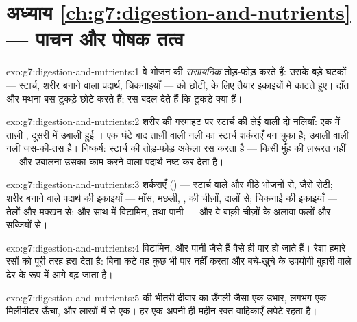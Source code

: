 \section*{अध्याय \ref{ch:g7:digestion-and-nutrients} --- पाचन और पोषक तत्व}

\begin{solution}{exo:g7:digestion-and-nutrients:1}
वे भोजन की \emph{रासायनिक} तोड़-फोड़ करते हैं: उसके बड़े घटकों ---
स्टार्च, शरीर बनाने वाला पदार्थ, चिकनाइयाँ --- को छोटी,  के लिए
तैयार इकाइयों में काटते हुए। दाँत और मथना बस टुकड़े छोटे करते हैं; रस
बदल देते हैं कि टुकड़े क्या हैं।
\end{solution}

\begin{solution}{exo:g7:digestion-and-nutrients:2}
शरीर की गरमाहट पर स्टार्च की लेई वाली दो नलियाँ: एक में ताज़ी ,
दूसरी में उबाली हुई । एक घंटे बाद ताज़ी वाली नली का स्टार्च शर्कराएँ
बन चुका है; उबाली वाली नली जस-की-तस है। निष्कर्ष: स्टार्च की तोड़-फोड़
अकेला रस करता है --- किसी मुँह की ज़रूरत नहीं --- और उबालना उसका काम
करने वाला पदार्थ नष्ट कर देता है।
\end{solution}

\begin{solution}{exo:g7:digestion-and-nutrients:3}
शर्कराएँ () --- स्टार्च वाले और मीठे भोजनों से, जैसे रोटी;
शरीर बनाने वाले पदार्थ की इकाइयाँ --- माँस, मछली, ,  की
चीज़ों, दालों से; चिकनाई की इकाइयाँ --- तेलों और मक्खन से; और साथ में
विटामिन,  तथा पानी --- और वे बाक़ी चीज़ों के अलावा फलों और
सब्ज़ियों से।
\end{solution}

\begin{solution}{exo:g7:digestion-and-nutrients:4}
विटामिन,  और पानी जैसे हैं वैसे ही पार हो जाते हैं। रेशा हमारे
रसों को पूरी तरह हरा देता है: बिना कटे वह कुछ भी पार नहीं करता और
बचे-खुचे के उपयोगी बुहारी वाले ढेर के रूप में आगे बढ़ जाता है।
\end{solution}

\begin{solution}{exo:g7:digestion-and-nutrients:5}
 की भीतरी दीवार का उँगली जैसा एक उभार, लगभग एक मिलीमीटर ऊँचा,
और लाखों में से एक। हर एक अपनी ही महीन रक्त-वाहिकाएँ लपेटे रहता है।
\end{solution}

